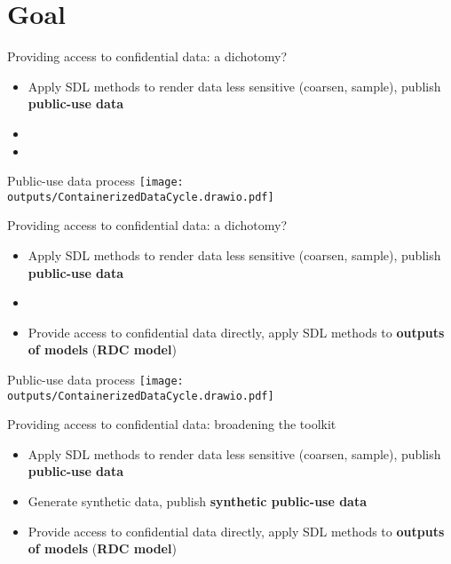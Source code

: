 \section{Goal}

\begin{frame}{Providing access to confidential data: a dichotomy?}
\begin{itemize}
    \item Apply SDL methods to render data less sensitive (coarsen, sample), publish \textbf{public-use data}
    \item[ ]
    \item[ ]
\end{itemize}
\end{frame}

\begin{frame}{Public-use data process}
\texttt{[image: outputs/ContainerizedDataCycle.drawio.pdf]}
\end{frame}

\begin{frame}{Providing access to confidential data: a dichotomy?}
\begin{itemize}
    \item Apply SDL methods to render data less sensitive (coarsen, sample), publish \textbf{public-use data}
    \item[ ]
    \item Provide access to confidential data directly, apply SDL methods to \textbf{outputs of models} (\textbf{RDC model})
\end{itemize}
\end{frame}

\begin{frame}{Public-use data process}
\texttt{[image: outputs/ContainerizedDataCycle.drawio.pdf]}
\end{frame}

\begin{frame}{Providing access to confidential data: broadening the toolkit}
\begin{itemize}
    \item Apply SDL methods to render data less sensitive (coarsen, sample), publish \textbf{public-use data}
    \item Generate synthetic data, publish \textbf{synthetic public-use data}
    \item Provide access to confidential data directly, apply SDL methods to \textbf{outputs of models} (\textbf{RDC model})
\end{itemize}
\end{frame}

